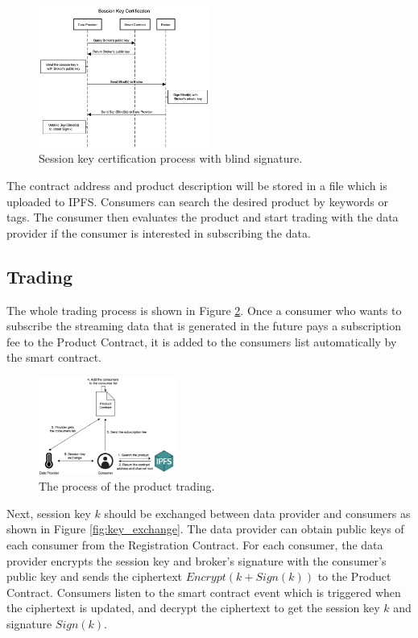 \documentclass[journal,10pt,a4paper]{IEEEtran}
\begin{document}
\begin{figure}[h]
    \centering
    \includegraphics[width=0.5\textwidth]{key_certification}
    \caption{Session key certification process with blind signature.}
    \label{fig:key_certification}
\end{figure}

The contract address and product description will be stored in a file which is uploaded to IPFS. Consumers can search the desired product by keywords or tags. The consumer then evaluates the product and start trading with the data provider if the consumer is interested in subscribing the data.

\subsection{Trading}
The whole trading process is shown in Figure \ref{fig:trading_product}. Once a consumer who wants to subscribe the streaming data that is generated in the future pays a subscription fee to the Product Contract, it is added to the consumers list automatically by the smart contract. 

\begin{figure}[h]
	\centering
	\includegraphics[width=0.4\textwidth]{trading_product}
	\caption{The process of the product trading.}
	\label{fig:trading_product}
\end{figure}

Next, session key $k$ should be exchanged between data provider and consumers as shown in Figure \ref{fig:key_exchange}. The data provider can obtain public keys of each consumer from the Registration Contract. For each consumer, the data provider encrypts the session key and broker's signature with the consumer's public key and sends the ciphertext $Encrypt(k + Sign(k))$ to the Product Contract. Consumers listen to the smart contract event which is triggered when the ciphertext is updated, and decrypt the ciphertext to get the session key $k$ and signature $Sign(k)$.
\end{document}
